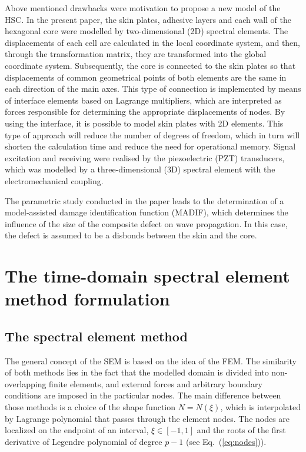 \documentclass[materials,article,submit,moreauthors,pdftex]{Definitions/mdpi}
\begin{document}
{Above mentioned drawbacks were motivation to propose a new model of the HSC. In the present paper, the skin plates, adhesive layers and each wall of the hexagonal core were modelled by two-dimensional (2D) spectral elements.
The displacements of each cell are calculated in the local coordinate system, and then, through the transformation matrix, they are transformed into the global coordinate system.
Subsequently, the core is connected to the skin plates so that displacements of common geometrical points of both elements are the same in each direction of the main axes.
This type of connection is implemented by means of interface elements based on Lagrange multipliers, which are interpreted as forces responsible for determining the appropriate displacements of nodes.
By using the interface, it is possible to model skin plates with 2D elements.
This type of approach will reduce the number of degrees of freedom, which in turn will shorten the calculation time and reduce the need for operational memory.
Signal excitation and receiving were realised by the piezoelectric (PZT) transducers, which was modelled by a three-dimensional (3D) spectral element with the electromechanical coupling.

The parametric study conducted in the paper leads to the determination of a model-assisted damage identification function (MADIF), which determines the influence of the size of the composite defect on wave propagation.
In this case, the defect is assumed to be a disbonds between the skin and the core.

\section{The time-domain spectral element method formulation}
\label{sec:time_SEM}
\subsection{The spectral element method}
\label{sec:sem}
The general concept of the SEM is based on the idea of the FEM.
The similarity of both methods lies in the fact that the modelled domain is divided into non-overlapping finite elements, and external forces and arbitrary boundary conditions are imposed in the particular nodes.
The main difference between those methods is a choice of the shape function \( N=N(\xi )\), which is interpolated by Lagrange polynomial that passes through the element nodes. The nodes are localized on the endpoint of an interval, \(\xi\in[-1,1]\) and the roots of the first derivative of Legendre polynomial of degree \(p-1\) (see Eq.~(\ref{eq:nodes})).

}
\end{document}
